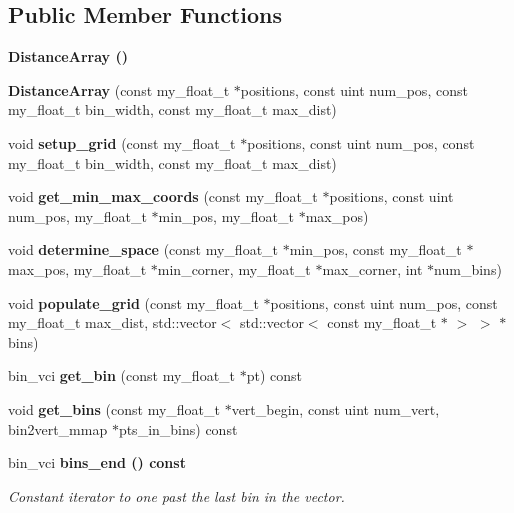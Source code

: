 \subsection*{Public Member Functions}
\begin{CompactItemize}
\item 
\bf{Distance\-Array} ()
\item 
\textbf{Distance\-Array} (const my\_\-float\_\-t $\ast$positions, const uint num\_\-pos, const my\_\-float\_\-t bin\_\-width, const my\_\-float\_\-t max\_\-dist)\label{classASCbase_1_1geometry_1_1DistanceArray_3838bfe2441f1dd98f87689aea5cf16a}

\item 
void \textbf{setup\_\-grid} (const my\_\-float\_\-t $\ast$positions, const uint num\_\-pos, const my\_\-float\_\-t bin\_\-width, const my\_\-float\_\-t max\_\-dist)\label{classASCbase_1_1geometry_1_1DistanceArray_501f917f566d2ae25bb0649db73e7625}

\item 
void \textbf{get\_\-min\_\-max\_\-coords} (const my\_\-float\_\-t $\ast$positions, const uint num\_\-pos, my\_\-float\_\-t $\ast$min\_\-pos, my\_\-float\_\-t $\ast$max\_\-pos)\label{classASCbase_1_1geometry_1_1DistanceArray_43c86d0510bafc7dc0cac5b2cba570a7}

\item 
void \textbf{determine\_\-space} (const my\_\-float\_\-t $\ast$min\_\-pos, const my\_\-float\_\-t $\ast$max\_\-pos, my\_\-float\_\-t $\ast$min\_\-corner, my\_\-float\_\-t $\ast$max\_\-corner, int $\ast$num\_\-bins)\label{classASCbase_1_1geometry_1_1DistanceArray_a4cc0a8c9a2b2474b11a3b0ed4c5bedd}

\item 
void \textbf{populate\_\-grid} (const my\_\-float\_\-t $\ast$positions, const uint num\_\-pos, const my\_\-float\_\-t max\_\-dist, std::vector$<$ std::vector$<$ const my\_\-float\_\-t $\ast$ $>$ $>$ $\ast$bins)\label{classASCbase_1_1geometry_1_1DistanceArray_4c9b723809adef008c0b4ca51774f726}

\item 
bin\_\-vci \textbf{get\_\-bin} (const my\_\-float\_\-t $\ast$pt) const \label{classASCbase_1_1geometry_1_1DistanceArray_98eb2f3e69db33ab79650d39da540ebf}

\item 
void \textbf{get\_\-bins} (const my\_\-float\_\-t $\ast$vert\_\-begin, const uint num\_\-vert, bin2vert\_\-mmap $\ast$pts\_\-in\_\-bins) const \label{classASCbase_1_1geometry_1_1DistanceArray_d78373acb3f5018b62772ecb9668c20f}

\item 
bin\_\-vci \bf{bins\_\-end} () const \label{classASCbase_1_1geometry_1_1DistanceArray_c287afc60a8d74ad4123b0e6a8f54eea}

\begin{CompactList}\small\item\em Constant iterator to one past the last bin in the vector. \item\end{CompactList}\end{CompactItemize}

